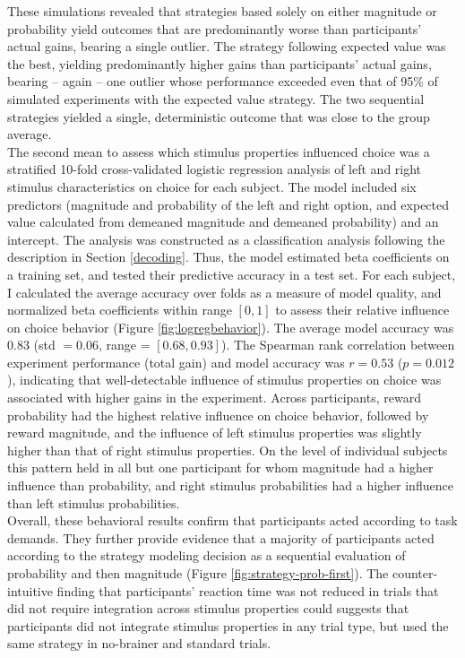 These simulations revealed that strategies based solely on either magnitude or probability yield outcomes that are predominantly worse than participants' actual gains, bearing a single outlier.
The strategy following expected value was the best, yielding predominantly higher gains than participants' actual gains, bearing -- again -- one outlier whose performance exceeded even that of 95\% of simulated experiments with the expected value strategy.
The two sequential strategies yielded a single, deterministic outcome that was close to the group average.\\
The second mean to assess which stimulus properties influenced choice was a stratified 10-fold cross-validated logistic regression analysis of left and right stimulus characteristics on choice for each subject.
The model included six predictors (magnitude and probability of the left and right option, and expected value calculated from demeaned magnitude and demeaned probability) and an intercept.
The analysis was constructed as a classification analysis following the description in Section \ref{decoding}.
Thus, the model estimated beta coefficients on a training set, and tested their predictive accuracy in a test set.
For each subject, I calculated the average accuracy over folds as a measure of model quality, and normalized beta coefficients within range $[0, 1]$ to assess their relative influence on choice behavior (Figure \ref{fig:logregbehavior}).
The average model accuracy was $0.83$ (std $=0.06$, range = $[0.68, 0.93]$).
The Spearman rank correlation between experiment performance (total gain) and model accuracy was $r=0.53$ ($p=0.012$), indicating that well-detectable influence of stimulus properties on choice was associated with higher gains in the experiment.
Across participants, reward probability had the highest relative influence on choice behavior, followed by reward magnitude, and the influence of left stimulus properties was slightly higher than that of right stimulus properties.
On the level of individual subjects this pattern held in all but one participant for whom magnitude had a higher influence than probability, and right stimulus probabilities had a higher influence than left stimulus probabilities.\\
Overall, these behavioral results confirm that participants acted according to task demands.
They further provide evidence that a majority of participants acted according to the strategy modeling decision as a sequential evaluation of probability and then magnitude (Figure \ref{fig:strategy-prob-first}).
The counter-intuitive finding that participants' reaction time was not reduced in trials that did not require integration across stimulus properties could suggests that participants did not integrate stimulus properties in any trial type, but used the same strategy in no-brainer and standard trials.


